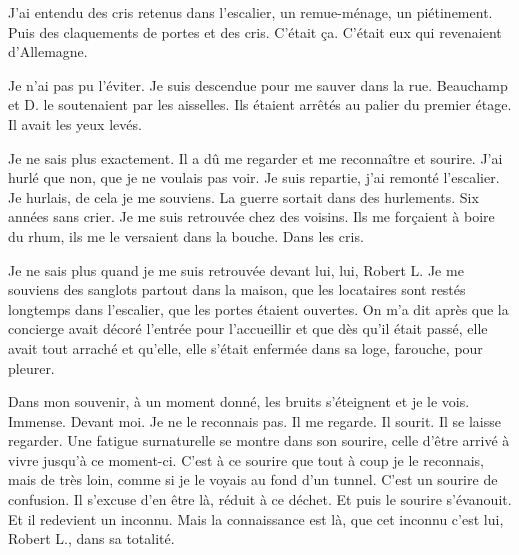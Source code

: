 
	{

J'ai entendu des cris retenus dans l'escalier, un remue-ménage, un
piétinement. Puis des claquements de portes et des cris. C'était ça.
C'était eux qui revenaient d'Allemagne.

Je n'ai pas pu l'éviter. Je suis descendue pour me sauver dans la rue.
Beauchamp et D. le soutenaient par les aisselles. Ils étaient arrêtés
au palier du premier étage. Il avait les yeux levés.

Je ne sais plus exactement. Il a dû me regarder et me reconnaître et
sourire. J'ai hurlé que non, que je ne voulais pas voir. Je suis
repartie, j'ai remonté l'escalier. Je hurlais, de cela je me
souviens. La guerre sortait dans des hurlements. Six années sans
crier. Je me suis retrouvée chez des voisins. Ils me forçaient à
boire du rhum, ils me le versaient dans la bouche. Dans les cris.

Je ne sais plus quand je me suis retrouvée devant lui, lui, Robert L.
Je me souviens des sanglots partout dans la maison, que les
locataires sont restés longtemps dans l'escalier, que les portes
étaient ouvertes. On m'a dit après que la concierge avait décoré
l'entrée pour l'accueillir et que dès qu'il était passé, elle avait
tout arraché et qu'elle, elle s'était enfermée dans sa loge,
farouche, pour pleurer.

\bigskip

Dans mon souvenir, à un moment donné, les bruits s'éteignent et je le
vois. Immense. Devant moi. Je ne le reconnais pas. Il me regarde. Il
sourit. Il se laisse regarder. Une fatigue surnaturelle se montre
dans son sourire, celle d'être arrivé à vivre jusqu'à ce moment-ci.
C'est à ce sourire que tout à coup je le reconnais, mais de très
loin, comme si je le voyais au fond d'un tunnel. C'est un sourire de
confusion. Il s'excuse d'en être là, réduit à ce déchet. Et puis le
sourire s'évanouit. Et il redevient un inconnu. Mais la connaissance
est là, que cet inconnu c'est lui, Robert L., dans sa totalité.

}
